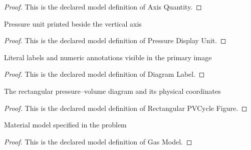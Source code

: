 \begin{proof}
  This is the declared model definition of Axis Quantity.
\end{proof}
\begin{definition}
  \label{def:physics:phyx-mini-0425:phyxminiproblems-problemphyxmini0425-pressuredisplayunit}
  Pressure unit printed beside the vertical axis
\end{definition}
\begin{proof}
  This is the declared model definition of Pressure Display Unit.
\end{proof}
\begin{definition}
  \label{def:physics:phyx-mini-0425:phyxminiproblems-problemphyxmini0425-diagramlabel}
  Literal labels and numeric annotations visible in the primary image
\end{definition}
\begin{proof}
  This is the declared model definition of Diagram Label.
\end{proof}
\begin{definition}
  \label{def:physics:phyx-mini-0425:phyxminiproblems-problemphyxmini0425-rectangularpvcyclefigure}
  The rectangular pressure--volume diagram and its physical coordinates
\end{definition}
\begin{proof}
  This is the declared model definition of Rectangular PVCycle Figure.
\end{proof}
\begin{definition}
  \label{def:physics:phyx-mini-0425:phyxminiproblems-problemphyxmini0425-gasmodel}
  Material model specified in the problem
\end{definition}
\begin{proof}
  This is the declared model definition of Gas Model.
\end{proof}
